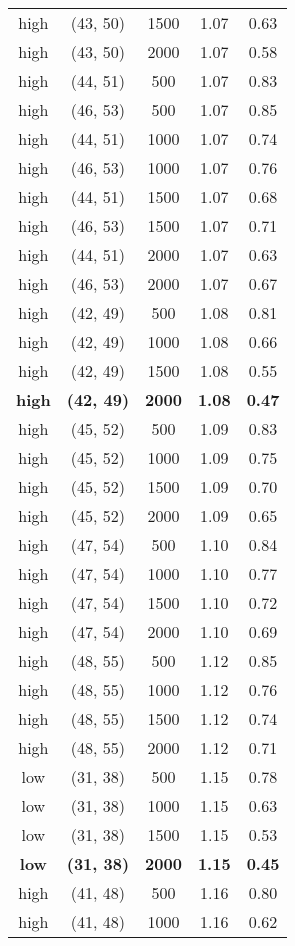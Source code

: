 \begin{tabular}{c c c c c}
high & (43, 50) &  1500 & 1.07 & 0.63 \\
high & (43, 50) &  2000 & 1.07 & 0.58 \\
high & (44, 51) &  500 & 1.07 & 0.83 \\
high & (46, 53) &  500 & 1.07 & 0.85 \\
high & (44, 51) &  1000 & 1.07 & 0.74 \\
high & (46, 53) &  1000 & 1.07 & 0.76 \\
high & (44, 51) &  1500 & 1.07 & 0.68 \\
high & (46, 53) &  1500 & 1.07 & 0.71 \\
high & (44, 51) &  2000 & 1.07 & 0.63 \\
high & (46, 53) &  2000 & 1.07 & 0.67 \\
high & (42, 49) &  500 & 1.08 & 0.81 \\
high & (42, 49) &  1000 & 1.08 & 0.66 \\
high & (42, 49) &  1500 & 1.08 & 0.55 \\
\textbf{high} & \textbf{(42, 49)} & \textbf{ 2000} & \textbf{1.08} & \textbf{0.47} \\
high & (45, 52) &  500 & 1.09 & 0.83 \\
high & (45, 52) &  1000 & 1.09 & 0.75 \\
high & (45, 52) &  1500 & 1.09 & 0.70 \\
high & (45, 52) &  2000 & 1.09 & 0.65 \\
high & (47, 54) &  500 & 1.10 & 0.84 \\
high & (47, 54) &  1000 & 1.10 & 0.77 \\
high & (47, 54) &  1500 & 1.10 & 0.72 \\
high & (47, 54) &  2000 & 1.10 & 0.69 \\
high & (48, 55) &  500 & 1.12 & 0.85 \\
high & (48, 55) &  1000 & 1.12 & 0.76 \\
high & (48, 55) &  1500 & 1.12 & 0.74 \\
high & (48, 55) &  2000 & 1.12 & 0.71 \\
low & (31, 38) &  500 & 1.15 & 0.78 \\
low & (31, 38) &  1000 & 1.15 & 0.63 \\
low & (31, 38) &  1500 & 1.15 & 0.53 \\
\textbf{low} & \textbf{(31, 38)} & \textbf{ 2000} & \textbf{1.15} & \textbf{0.45} \\
high & (41, 48) &  500 & 1.16 & 0.80 \\
high & (41, 48) &  1000 & 1.16 & 0.62 \\

\end{tabular}
